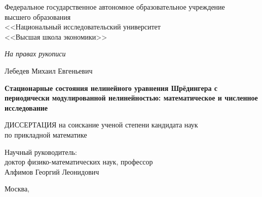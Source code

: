 \begin{titlepage}
\thispagestyle{empty}
\enlargethispage{1cm}
\vspace*{-2cm}

\begin{center}
	Федеральное государственное автономное образовательное учреждение \\ высшего образования \\ <<Национальный исследовательский университет \\ <<Высшая школа экономики>>
\end{center}

\vskip1cm
	
\begin{flushright}
	\emph{На правах рукописи}
\end{flushright}
	
\vskip2cm

\begin{center}
	{\large Лебедев Михаил Евгеньевич}
	\vskip1cm
	{\large\bfseries Стационарные состояния нелинейного уравнения Шрёдингера с периодически модулированной нелинейностью: математическое и численное исследование\par}
	\vskip1cm
	{ДИССЕРТАЦИЯ}
	\vskip1cm
	{на соискание ученой степени кандидата наук \\ по прикладной математике}
\end{center}

\vskip2cm

\hspace{5cm}
\begin{minipage}{0.65\linewidth}
\begin{flushright}
	Научный руководитель: \\
	доктор физико-математических наук, профессор \\
	Алфимов Георгий Леонидович
\end{flushright}
\end{minipage}

\vfill

\begin{center}
	{Москва, \the\year}
\end{center}

\normalfont\clearpage
\end{titlepage}
